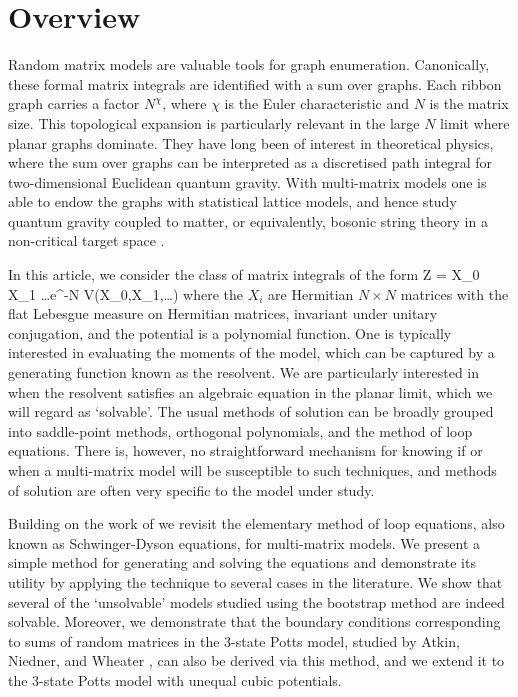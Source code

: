 \section{Overview}

Random matrix models are valuable tools for graph enumeration. Canonically, these formal matrix
integrals are identified with a sum over graphs. Each ribbon graph carries a factor $N^\chi$, where $\chi$ is the Euler characteristic and $N$ is the matrix size. This topological expansion is particularly relevant in the large $N$ limit
where planar graphs dominate. They have long been of interest in theoretical physics, where the
sum over graphs can be interpreted as a discretised path integral for two-dimensional Euclidean
quantum gravity. With multi-matrix models one is able to endow the graphs with statistical lattice
models, and hence study quantum gravity coupled to matter, or equivalently, bosonic string theory
in a non-critical target space \cite{DiFrancesco:1993cyw, ginsparg1993lectures, Ambjorn:1997di}.

In this article, we consider the class of matrix integrals of the form \beq Z = \int \rmd X_0 \rmd
    X_1 \ldots e^{-N \Tr V(X_0,X_1,\ldots)}
\eeq
where the $X_i$ are Hermitian $N\times N$ matrices with the flat Lebesgue measure on Hermitian matrices, invariant under unitary conjugation, and the
potential is a polynomial function. One is typically interested in evaluating the moments of the
model, which can be captured by a generating function known as the resolvent. We are particularly
interested in when the resolvent satisfies an algebraic equation in the planar limit, which we will
regard as ‘solvable’. The usual methods of solution can be broadly grouped into saddle-point
methods, orthogonal polynomials, and the method of loop equations. There is, however, no
straightforward mechanism for knowing if or when a multi-matrix model will be susceptible to such
techniques, and methods of solution are often very specific to the model under study.

Building on the work of \cite{Carroll:1995nj, kulanthaivelu2019freevariableloopequations} we revisit the elementary method of loop equations, also known as Schwinger-Dyson equations,
for multi-matrix models. We present a simple method for generating and solving the equations and
demonstrate its utility by applying the technique to several cases in the literature. We show that
several of the ‘unsolvable’ models studied using the bootstrap method
\cite{khalkhali2025bootstrappingcriticalbehaviormultimatrix} are indeed solvable. Moreover, we
demonstrate that the boundary conditions corresponding to sums of random matrices in the 3-state
Potts model, studied by Atkin, Niedner, and Wheater \cite{Atkin:2015ksy}, can also be derived via
this method, and we extend it to the 3-state Potts
model with unequal cubic potentials.

